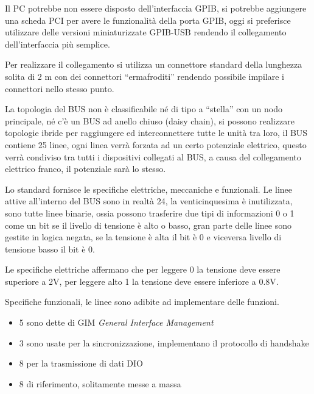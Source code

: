Il PC potrebbe non essere disposto dell'interfaccia GPIB, si potrebbe
aggiungere una scheda PCI per avere le funzionalità della porta GPIB, oggi si
preferisce utilizzare delle versioni miniaturizzate GPIB-USB rendendo il
collegamento dell'interfaccia più semplice.

Per realizzare il collegamento si utilizza un connettore standard della
lunghezza solita di 2 m con dei connettori ``ermafroditi'' rendendo possibile
impilare i connettori nello stesso punto.

La topologia del BUS non è classificabile né di tipo a ``stella'' con un nodo
principale, né c'è un BUS ad anello chiuso (daisy chain), si possono realizzare
topologie ibride per raggiungere ed interconnettere tutte le unità tra loro, il
BUS contiene 25 linee, ogni linea verrà forzata ad un certo potenziale
elettrico, questo verrà condiviso tra tutti i dispositivi collegati al BUS, a
causa del collegamento elettrico franco, il potenziale sarà lo stesso.

Lo standard fornisce le specifiche elettriche, meccaniche e funzionali.
Le linee attive all'interno del BUS sono in realtà 24, la venticinquesima è
inutilizzata, sono tutte linee binarie, ossia possono trasferire
due tipi di informazioni 0 o 1 come un bit se il livello di tensione è alto o
basso, gran parte delle linee sono gestite in logica negata, se la tensione è
alta il bit è 0 e viceversa livello di tensione basso il bit è 0.

Le specifiche elettriche affermano che per leggere 0 la tensione deve essere
superiore a 2V, per leggere alto 1 la tensione deve essere inferiore a 0.8V.

Specifiche funzionali, le linee sono adibite ad implementare delle funzioni.
\begin{itemize}
\item 5 sono dette di GIM \textit{General Interface Management}
\item 3 sono usate per la sincronizzazione, implementano il protocollo di
handshake
\item 8 per la trasmissione di dati DIO
\item 8 di riferimento, solitamente messe a massa
\end{itemize}

